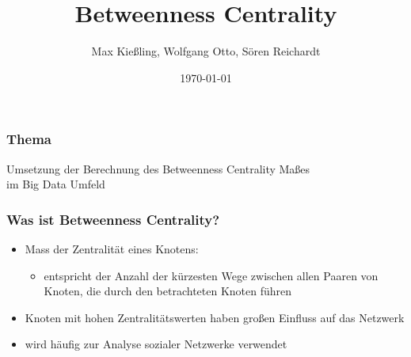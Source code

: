 \documentclass{beamer}
\title[Betweenness Centrality]{Betweenness Centrality} %
\author{Max Kießling, Wolfgang Otto, Sören Reichardt} %
\institute[UL] %
{
Unitversität Leipzig \\ %
\medskip
\textit{} %
}
\date{\today} %
\begin{document}
\begin{frame}
\titlepage %
\end{frame}


\begin{frame}
\frametitle{Thema}
\centering
Umsetzung der Berechnung des Betweenness Centrality Maßes \\
im Big Data Umfeld
\end{frame}

\begin{frame}
\frametitle{Was ist Betweenness Centrality?}
\begin{itemize}
\item Mass der Zentralität eines Knotens:
	\begin{itemize}
	\item entspricht der Anzahl der kürzesten Wege zwischen allen Paaren von Knoten, die durch den betrachteten Knoten führen
	\end{itemize}
\item Knoten mit hohen Zentralitätswerten haben großen Einfluss auf das Netzwerk
\item wird häufig zur Analyse sozialer Netzwerke verwendet
	

\end{itemize}
\end{frame}

\end{document}
